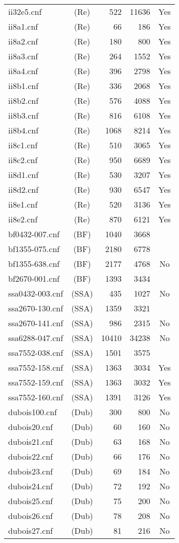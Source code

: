 \begin{supertabular}{|lc|rr|c|}
ii32e5.cnf&(Re)&522 &11636 &Yes\\
ii8a1.cnf&(Re)&66 &186 &Yes\\
ii8a2.cnf&(Re)&180 &800 &Yes\\
ii8a3.cnf&(Re)&264 &1552 &Yes\\
ii8a4.cnf&(Re)&396 &2798 &Yes\\
ii8b1.cnf&(Re)&336 &2068 &Yes\\
ii8b2.cnf&(Re)&576 &4088 &Yes\\
ii8b3.cnf&(Re)&816 &6108 &Yes\\
ii8b4.cnf&(Re)&1068 &8214 &Yes\\
ii8c1.cnf&(Re)&510 &3065 &Yes\\
ii8c2.cnf&(Re)&950 &6689 &Yes\\
ii8d1.cnf&(Re)&530 &3207 &Yes\\
ii8d2.cnf&(Re)&930 &6547 &Yes\\
ii8e1.cnf&(Re)&520 &3136 &Yes\\
ii8e2.cnf&(Re)&870 &6121 &Yes\\
bf0432-007.cnf&(BF)&1040&3668&\\ 
bf1355-075.cnf&(BF)& 2180&6778&\\
bf1355-638.cnf&(BF)& 2177&4768&No\\
bf2670-001.cnf&(BF)& 1393&3434&\\
ssa0432-003.cnf&(SSA)&435&1027&No\\   
ssa2670-130.cnf&(SSA)&1359&3321&\\    
ssa2670-141.cnf&(SSA)&986&2315&No\\   
ssa6288-047.cnf&(SSA)&10410&34238&No\\
ssa7552-038.cnf&(SSA)&1501&3575&\\
ssa7552-158.cnf&(SSA)&1363&3034&Yes\\
ssa7552-159.cnf&(SSA)&1363&3032&Yes\\
ssa7552-160.cnf&(SSA)&1391&3126&Yes\\
dubois100.cnf&(Dub)&300&800&No\\
dubois20.cnf&(Dub)&60&160&No\\
dubois21.cnf&(Dub)&63&168&No\\
dubois22.cnf&(Dub)&66&176&No\\
dubois23.cnf&(Dub)&69&184&No\\
dubois24.cnf&(Dub)&72&192&No\\
dubois25.cnf&(Dub)&75&200&No\\
dubois26.cnf&(Dub)&78&208&No\\
dubois27.cnf&(Dub)&81&216&No\\

\end{supertabular}
